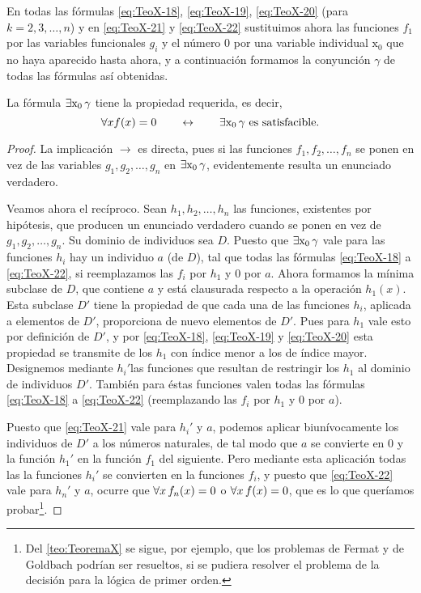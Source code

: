 En todas las fórmulas \eqref{eq:TeoX-18}, \eqref{eq:TeoX-19}, \eqref{eq:TeoX-20} (para $ k=2,3, \dots, n$) y en \eqref{eq:TeoX-21} y \eqref{eq:TeoX-22} sustituimos
ahora las funciones $f_1$ por las variables funcionales $g_i$ y el número $0$ por una variable individual $\text{x}_0$ que no haya aparecido hasta ahora, y a continuación 
formamos la conyunción $\gamma$ de todas las fórmulas así obtenidas.
\begin{corolario}
    La fórmula $\exists \text{x}_0 \thinspace \gamma$ tiene la propiedad requerida, es decir,
    $$\forall x f(x) = 0 \qquad \leftrightarrow \qquad \exists \text{x}_0 \thinspace \gamma \text{ es satisfacible.}$$
\end{corolario}
\begin{proof}
    La implicación $\rightarrow$ es directa, pues si las funciones $f_1, f_2, \dots, f_n$ se ponen en vez de las variables $g_1, g_2, \dots, g_n$ en 
    $\exists \text{x}_0 \thinspace \gamma$, evidentemente resulta un enunciado verdadero.

    Veamos ahora el recíproco. Sean $h_1, h_2, \dots, h_n$ las funciones, existentes por hipótesis, que producen un enunciado verdadero cuando se ponen en vez de
    $g_1, g_2, \dots, g_n$. Su dominio de individuos sea $D$. Puesto que $\exists \text{x}_0 \thinspace \gamma$ vale para las funciones $h_i$ hay un individuo $a$ 
    (de $D$), tal que todas las fórmulas \eqref{eq:TeoX-18} a \eqref{eq:TeoX-22}, si reemplazamos las $f_i$ por $h_1$ y $0$ por $a$. Ahora formamos la mínima subclase de $D$, que
    contiene $a$ y está clausurada respecto a la operación $h_1(x)$. Esta subclase $D'$ tiene la propiedad de que cada una de las funciones $h_i$, aplicada a elementos de $D'$, 
    proporciona de nuevo elementos de $D'$. Pues para $h_1$ vale esto por definición de $D'$, y por \eqref{eq:TeoX-18}, \eqref{eq:TeoX-19} y \eqref{eq:TeoX-20} esta propiedad se 
    transmite de los $h_1$ con índice menor a los de índice mayor. Designemos mediante $h_i'$las funciones que resultan de restringir los $h_1$ al dominio de individuos $D'$.
    También para éstas funciones valen todas las fórmulas \eqref{eq:TeoX-18} a \eqref{eq:TeoX-22} (reemplazando las $f_i$ por $h_1$ y $0$ por $a$).

    Puesto que \eqref{eq:TeoX-21} vale para $h_i'$ y $a$, podemos aplicar biunívocamente los individuos de $D'$ a los números naturales, de tal modo que $a$ se convierte en $0$
    y la función $h_1'$ en la función $f_1$ del siguiente. Pero mediante esta aplicación todas las la funciones $h_i'$ se convierten en la funciones $f_i$, y puesto que 
    \eqref{eq:TeoX-22} vale para $h_n'$ y $a$, ocurre que $\forall x \thinspace f_n(x) = 0$ o $\forall x \thinspace f(x) = 0$, que es lo que queríamos probar\footnote{Del
    \autoref{teo:TeoremaX} se sigue, por ejemplo, que los problemas de Fermat y de Goldbach podrían ser resueltos, si se pudiera resolver el problema de la decisión para la 
    lógica de primer orden.}.
\end{proof}

